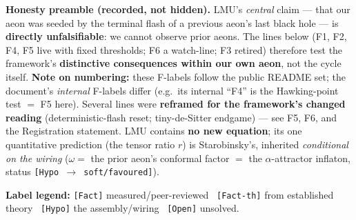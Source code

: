 \documentclass[11pt,a4paper]{article}
\newcommand{\st}[1]{\texttt{[#1]}}
\begin{document}
\textbf{Honesty preamble (recorded, not hidden).} LMU's \emph{central} claim --- that our aeon was seeded by the terminal flash of a previous aeon's last black hole --- is \textbf{directly unfalsifiable}: we cannot observe prior aeons. The lines below (F1, F2, F4, F5 live with fixed thresholds; F6 a watch-line; F3 retired) therefore test the framework's \textbf{distinctive consequences within our own aeon}, not the cycle itself. \textbf{Note on numbering:} these F-labels follow the public README set; the document's \emph{internal} F-labels differ (e.g.\ its internal ``F4'' is the Hawking-point test $=$ F5 here). Several lines were \textbf{reframed for the framework's changed reading} (deterministic-flash reset; tiny-de-Sitter endgame) --- see F5, F6, and the Registration statement. LMU contains \textbf{no new equation}; its one quantitative prediction (the tensor ratio $r$) is Starobinsky's, inherited \emph{conditional on the wiring} ($\omega =$ the prior aeon's conformal factor $=$ the $\alpha$-attractor inflaton, status \st{Hypo $\to$ soft/favoured}).

\textbf{Label legend:} \st{Fact} measured/peer-reviewed \textperiodcentered\ \st{Fact-th} from established theory \textperiodcentered\ \st{Hypo} the assembly/wiring \textperiodcentered\ \st{Open} unsolved.

\hrulefill
\end{document}
